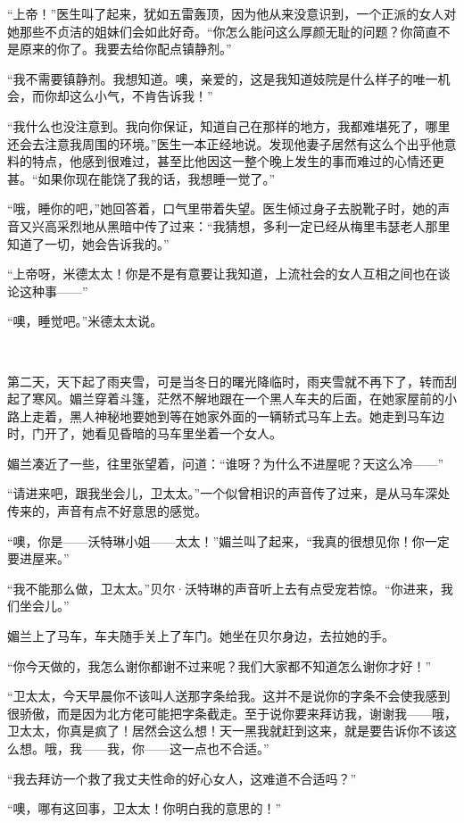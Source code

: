 \par “上帝！”医生叫了起来，犹如五雷轰顶，因为他从来没意识到，一个正派的女人对她那些不贞洁的姐妹们会如此好奇。“你怎么能问这么厚颜无耻的问题？你简直不是原来的你了。我要去给你配点镇静剂。”
\par “我不需要镇静剂。我想知道。噢，亲爱的，这是我知道妓院是什么样子的唯一机会，而你却这么小气，不肯告诉我！”
\par “我什么也没注意到。我向你保证，知道自己在那样的地方，我都难堪死了，哪里还会去注意我周围的环境。”医生一本正经地说。发现他妻子居然有这么个出乎他意料的特点，他感到很难过，甚至比他因这一整个晚上发生的事而难过的心情还更甚。“如果你现在能饶了我的话，我想睡一觉了。”
\par “哦，睡你的吧，”她回答着，口气里带着失望。医生倾过身子去脱靴子时，她的声音又兴高采烈地从黑暗中传了过来：“我猜想，多利一定已经从梅里韦瑟老人那里知道了一切，她会告诉我的。”
\par “上帝呀，米德太太！你是不是有意要让我知道，上流社会的女人互相之间也在谈论这种事——”
\par “噢，睡觉吧。”米德太太说。
\par  
\par 第二天，天下起了雨夹雪，可是当冬日的曙光降临时，雨夹雪就不再下了，转而刮起了寒风。媚兰穿着斗篷，茫然不解地跟在一个黑人车夫的后面，在她家屋前的小路上走着，黑人神秘地要她到等在她家外面的一辆轿式马车上去。她走到马车边时，门开了，她看见昏暗的马车里坐着一个女人。
\par 媚兰凑近了一些，往里张望着，问道：“谁呀？为什么不进屋呢？天这么冷——”
\par “请进来吧，跟我坐会儿，卫太太。”一个似曾相识的声音传了过来，是从马车深处传来的，声音有点不好意思的感觉。
\par “噢，你是——沃特琳小姐——太太！”媚兰叫了起来，“我真的很想见你！你一定要进屋来。”
\par “我不能那么做，卫太太。”贝尔·沃特琳的声音听上去有点受宠若惊。“你进来，我们坐会儿。”
\par 媚兰上了马车，车夫随手关上了车门。她坐在贝尔身边，去拉她的手。
\par “你今天做的，我怎么谢你都谢不过来呢？我们大家都不知道怎么谢你才好！”
\par “卫太太，今天早晨你不该叫人送那字条给我。这并不是说你的字条不会使我感到很骄傲，而是因为北方佬可能把字条截走。至于说你要来拜访我，谢谢我——哦，卫太太，你真是疯了！居然会这么想！天一黑我就赶到这来，就是要告诉你不该这么想。哦，我——我，你——这一点也不合适。”
\par “我去拜访一个救了我丈夫性命的好心女人，这难道不合适吗？”
\par “噢，哪有这回事，卫太太！你明白我的意思的！”
